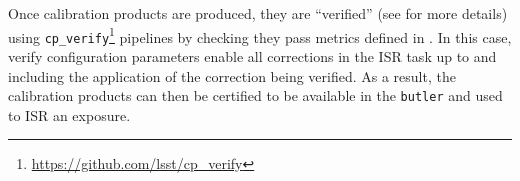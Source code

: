 Once calibration products are produced, they are ``verified'' (see \citet{DMTN-222} for more details) using \texttt{cp\_verify}\footnote{\url{https://github.com/lsst/cp\_verify}} pipelines by checking they pass metrics defined in \citet{DMTN-101}.
In this case, verify configuration parameters enable all corrections in the ISR task up to and including the application of the correction being verified. As a result, the calibration products can then be certified to be available in the \texttt{butler} and used to ISR an exposure.
